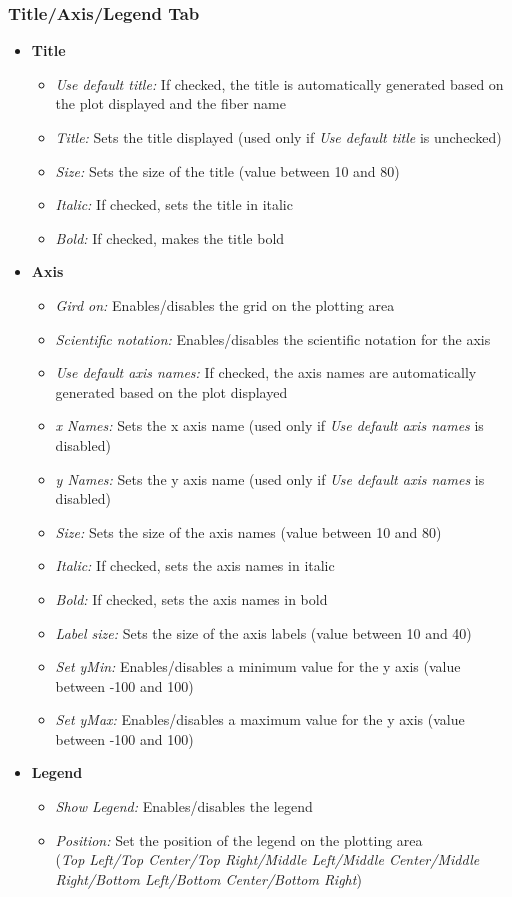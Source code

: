 \documentclass[fadttsterUserGuide_use]{subfiles}
\begin{document}
	\subsubsection{Title/Axis/Legend Tab}
 	\begin{itemize}
 		\item \textbf{Title}
 		\begin{itemize}
 			\item \textit{Use default title:} If checked, the title is automatically generated based on the plot displayed and the fiber name
 			\item \textit{Title:} Sets the title displayed (used only if \textit{Use default title} is unchecked)
 			\item \textit{Size:} Sets the size of the title (value between 10 and 80)
 			\item \textit{Italic:} If checked, sets the title in italic
 			\item \textit{Bold:} If checked, makes the title bold
 		\end{itemize}
 		\item \textbf{Axis}
 		\begin{itemize}
 			\item \textit{Gird on:} Enables/disables the grid on the plotting area
 			\item \textit{Scientific notation:} Enables/disables the scientific notation for the axis
 			\item \textit{Use default axis names:} If checked, the axis names are automatically generated based on the plot displayed
 			\item \textit{x Names:} Sets the x axis name (used only if \textit{Use default axis names} is disabled)
 			\item \textit{y Names:} Sets the y axis name (used only if \textit{Use default axis names} is disabled)
 			\item \textit{Size:} Sets the size of the axis names (value between 10 and 80)
 			\item \textit{Italic:} If checked, sets the axis names in italic
 			\item \textit{Bold:} If checked, sets the axis names in bold
 			\item \textit{Label size:} Sets the size of the axis labels (value between 10 and 40)
 			\item \textit{Set yMin:} Enables/disables a minimum value for the y axis (value between -100 and 100)
 			\item \textit{Set yMax:} Enables/disables a maximum value for the y axis (value between -100 and 100)
 		\end{itemize}
 		\item \textbf{Legend}
 		\begin{itemize}
 			\item \textit{Show Legend:} Enables/disables the legend
 			\item \textit{Position:} Set the position of the legend on the plotting area\\
 			(\textit{Top Left/Top Center/Top Right/Middle Left/Middle Center/Middle Right/Bottom Left/Bottom Center/Bottom Right})
 		\end{itemize}
 	\end{itemize}
\end{document}
